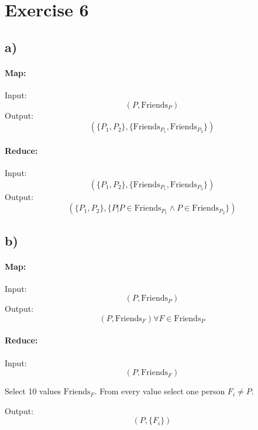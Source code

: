 \section*{Exercise 6}
\subsection*{a)}
\paragraph*{Map:}
Input: \[(P,\text{Friends}_P)\]
Output: \[(\lbrace P_1, P_2\rbrace,\lbrace \text{Friends}_{P_1},\text{Friends}_{P_2} \rbrace )\]
\paragraph*{Reduce:}
Input:
\[(\lbrace P_1, P_2\rbrace,\lbrace \text{Friends}_{P_1},\text{Friends}_{P_2} \rbrace )\]
Output: \[(\lbrace P_1, P_2\rbrace,\lbrace P|P\in \text{Friends}_{P_1} \wedge P\in \text{Friends}_{P_2} \rbrace )\]

\subsection*{b)}
\paragraph*{Map:}
Input: \[(P,\text{Friends}_P)\]
Output: \[(P,\text{Friends}_F ) \forall F\in \text{Friends}_P\]
\paragraph*{Reduce:}
Input:
\[(P,\text{Friends}_F )\]

Select 10 values $\text{Friends}_F$.
From every value select one person $F_i \neq P$.

Output: 
\[(P,\lbrace F_i \rbrace)\]